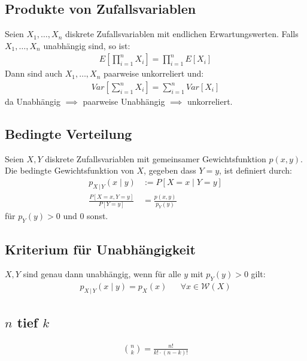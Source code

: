 \documentclass[8pt]{extarticle}
\newcommand{\W}{\mathcal{W}}
\newcommand{\Sn}{\sum_{i = 1}^n}
\newcommand{\Pn}{\prod_{i = 1}^n}
\newcommand{\cond}[2]{P[#1 \; | \; #2]}
\newcommand{\zufallsvariablen}{X_1, \dots, X_n}
\begin{document}
\begin{multicols*}{3}
  \subsection*{Produkte von Zufallsvariablen}
  Seien $\zufallsvariablen$ diskrete Zufallsvariablen mit endlichen
  Erwartungswerten. Falls $\zufallsvariablen$ unabhängig sind, so ist:
  \begin{align*}
    E \left[ \Pn X_i \right] = \Pn E[X_i]
  \end{align*}
  Dann sind auch $\zufallsvariablen$ paarweise unkorreliert und:
  \begin{align*}
    Var \left[ \Sn X_i \right] = \Sn Var[X_i]
  \end{align*}
  da Unabhängig $\implies$ paarweise Unabhängig $\implies$ unkorreliert.
  \subsection*{Bedingte Verteilung}
  Seien $X, Y$ diskrete Zufallsvariablen mit gemeinsamer Gewichtsfunktion $p (x,
    y)$. Die bedingte Gewichtsfunktion von $X$, gegeben dass $Y = y$, ist definiert
  durch:
  \begin{align*}
    p_{X \, | \, Y} (x \; | \; y)     & := \cond{X = x}{Y = y}   \\
    \frac{P[X = x, Y = y]}{P[Y = y]} & = \frac{p (x, y)}{p_Y (y)}
  \end{align*}
  für $p_Y (y) > 0$ und $0$ sonst.
  \subsection*{Kriterium für Unabhängigkeit}
  $X, Y$ sind genau dann unabhängig, wenn für alle $y$ mit $p_Y (y) > 0$
  gilt:
  \begin{align*}
    p_{X\,|\,Y} (x \; | \; y) = p_X (x) &  & \forall x \in \W (X)
  \end{align*}
  \subsection*{$n$ tief $k$}
  \begin{align*}
    \binom{n}{k} = \frac{n!}{k! \cdot  (n - k)!}
  \end{align*}

\end{multicols*}
\end{document}
